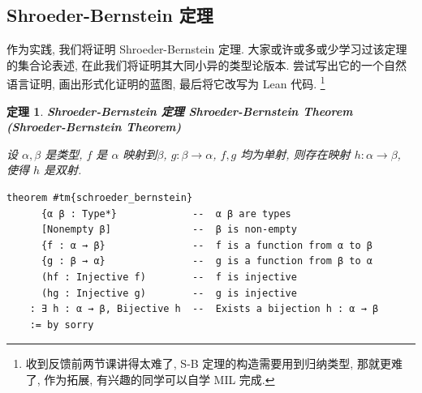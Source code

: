 \documentclass[UTF8]{ctexart}
\DeclareMathOperator{\0}{\mathbf{0}}                    %
\newcommand{\<}{\langle}
\renewcommand{\>}{\rangle}                              %
\newenvironment{thm_box}{
    \begin{tcolorbox}[enhanced, colback=thm_blue2, boxrule=0pt, frame hidden,
        borderline west={0.7mm}{0.1mm}{thm_blue1},breakable]
    }
    {\end{tcolorbox}}
\theoremstyle{MyStyle} %
\newtheorem{theorem}[definition]{定理}
\newenvironment{thm}[2]
{
    \begin{thm_box}
        \begin{theorem}
            \textbf{#1
                \ifx\relax#2\relax\else %
                    (#2) %
                \fi}
            \newline
}
{
        \end{theorem}
    \end{thm_box}
}
\begin{document}
    \subsection{Shroeder-Bernstein 定理}

        作为实践, 我们将证明 Shroeder-Bernstein 定理. 大家或许或多或少学习过该定理的集合论表述, 在此我们将证明其大同小异的类型论版本. 尝试写出它的一个自然语言证明, 画出形式化证明的蓝图, 最后将它改写为 Lean 代码. \footnote{收到反馈前两节课讲得太难了, S-B 定理的构造需要用到归纳类型, 那就更难了, 作为拓展, 有兴趣的同学可以自学 MIL 完成. }
        
        \begin{thm}
            {Shroeder-Bernstein 定理}
            {Shroeder-Bernstein Theorem}
            设 $\alpha,\beta$ 是类型, $f$ 是 $\alpha$ 映射到$\beta$, $g:\beta\to\alpha$, $f,g$ 均为单射, 则存在映射 $h:\alpha\to\beta$, 使得 $h$ 是双射. 
            \begin{lstlisting}[style=lean]
    theorem #tm{schroeder_bernstein}
      {α β : Type*}             --  α β are types
      [Nonempty β]              --  β is non-empty
      {f : α → β}               --  f is a function from α to β
      {g : β → α}               --  g is a function from β to α
      (hf : Injective f)        --  f is injective
      (hg : Injective g)        --  g is injective
    : ∃ h : α → β, Bijective h  --  Exists a bijection h : α → β
    := by sorry
            \end{lstlisting}
        \end{thm}

        
            
\end{document}
